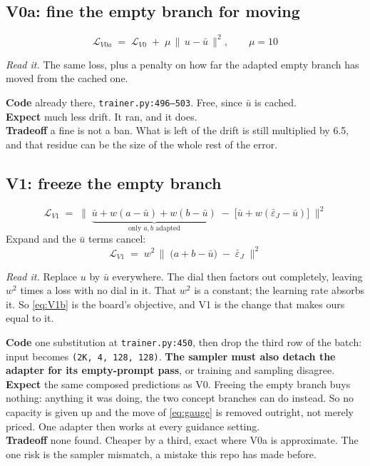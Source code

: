\documentclass[11pt]{article}
\newcommand{\eps}{\varepsilon}
\newcommand{\shape}[1]{\texttt{(#1)}}
\newcommand{\B}[1]{\textbf{#1}}
\newcommand{\LL}{\mathcal{L}}
\newcommand{\sq}[1]{\Big\lVert #1 \Big\rVert^2}
\newcommand{\readit}[1]{\par\smallskip\noindent\textit{Read it.} #1}
\begin{document}
\subsection*{V0a: fine the empty branch for moving}
\begin{equation}
  \LL_{V0a} \;=\; \LL_{V0} \;+\; \mu\,\sq{\,u - \bar u\,}, \qquad \mu = 10
\end{equation}
\readit{The same loss, plus a penalty on how far the adapted empty branch has moved from the cached
one.}

\noindent\B{Code} \quad already there, \texttt{trainer.py:496--503}. Free, since $\bar u$ is
cached.\\
\B{Expect} \quad much less drift. It ran, and it does.\\
\B{Tradeoff} \quad a fine is not a ban. What is left of the drift is still multiplied by 6.5, and
that residue can be the size of the whole rest of the error.

\subsection*{V1: freeze the empty branch}
\begin{equation}
  \LL_{V1} \;=\; \sq{\;\underbrace{\bar u + w(a-\bar u) + w(b-\bar u)}_{\text{only } a,b \text{ adapted}}
  \;-\;\big[\bar u + w(\bar\eps_J - \bar u)\big]\;}
  \label{eq:V1}
\end{equation}
Expand and the $\bar u$ terms cancel:
\begin{equation}
  \LL_{V1} \;=\; w^2\,\sq{\;\big(a + b - \bar u\big) \;-\; \bar\eps_J\;}
  \label{eq:V1b}
\end{equation}
\readit{Replace $u$ by $\bar u$ everywhere. The dial then factors out completely, leaving $w^2$
times a loss with no dial in it. That $w^2$ is a constant; the learning rate absorbs it. So
\eqref{eq:V1b} is the board's objective, and V1 is the change that makes ours equal to it.}

\noindent\B{Code} \quad one substitution at \texttt{trainer.py:450}, then drop the third row of the
batch: input becomes \shape{2K, 4, 128, 128}. \B{The sampler must also detach the adapter for its
empty-prompt pass}, or training and sampling disagree.\\
\B{Expect} \quad the same composed predictions as V0. Freeing the empty branch buys nothing:
anything it was doing, the two concept branches can do instead. So no capacity is given up and the
move of \eqref{eq:gauge} is removed outright, not merely priced. One adapter then works at every guidance
setting.\\
\B{Tradeoff} \quad none found. Cheaper by a third, exact where V0a is approximate. The one risk is
the sampler mismatch, a mistake this repo has made before.
\end{document}
